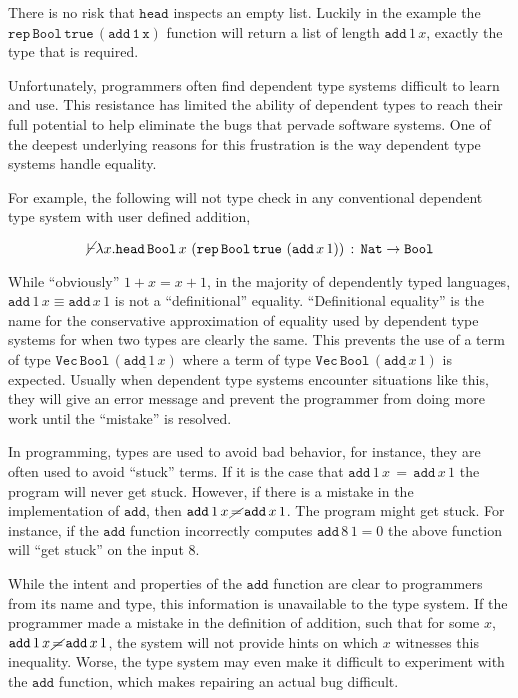 There is no risk that $\mathtt{head}$ inspects an empty list.
Luckily in the example the $\mathtt{\mathtt{rep}\,\mathtt{Bool}\,\mathtt{true}\,\left(\mathtt{add}\,1\,x\right)}$ function will return a list of length $\mathtt{add}\,1\,x$, exactly the type that is required.


Unfortunately, programmers often find dependent type systems difficult to learn and use.
This resistance has limited the ability of dependent types to reach their full potential to help eliminate the bugs that pervade software systems.
One of the deepest underlying reasons for this frustration is the way dependent type systems handle equality.

For example, the following will not type check in any conventional dependent type system with user defined addition,

\[
\cancel{\vdash}\lambda x.\mathtt{head}\,\mathtt{Bool}\,x\,\left(\mathtt{rep}\,\mathtt{Bool}\,\mathtt{true}\,\left(\mathtt{add}\,x\,1\right)\right)\,:\,\mathtt{Nat}\rightarrow\mathtt{Bool}
\]

While ``obviously'' $1+x=x+1$, in the majority of dependently typed languages, $\mathtt{add}\,1\,x\equiv\mathtt{add}\,x\,1$ is not a ``definitional'' equality.
``Definitional equality'' is the name for the conservative approximation of equality used by dependent type systems for when two types are clearly the same.
This prevents the use of a term of type
$\mathtt{Vec}\,\mathtt{Bool}\,\left(\underline{\mathtt{add}\,1\,x}\right)$
where a term of type
$\mathtt{Vec}\,\mathtt{Bool}\,\left(\underline{\mathtt{add}\,x\,1}\right)$
is expected.
Usually when dependent type systems encounter situations like this, they will give an error message and prevent the programmer from doing more work until the ``mistake'' is resolved.

In programming, types are used to avoid bad behavior, for instance, they are often used to avoid ``stuck'' terms.
If it is the case that $\mathtt{add}\,1\,x\,=\,\mathtt{add}\,x\,1$ the program will never get stuck.
However, if there is a mistake in the implementation of $\mathtt{add}$, then $\mathtt{add}\,1\,x\,\cancel{=}\,\mathtt{add}\,x\,1$.
The program might get stuck.
For instance, if the $\mathtt{add}$ function incorrectly computes $\mathtt{add}\,8\,1=0$ the above function will ``get stuck'' on the input $8$.

While the intent and properties of the $\mathtt{add}$ function are clear to programmers from its name and type, this information is unavailable to the type system.
If the programmer made a mistake in the definition of addition, such that for some $x$, $\mathtt{add}\,1\,x\,\cancel{=}\,\mathtt{add}\,x\,1$, the system will not provide hints on which $x$ witnesses this inequality.
Worse, the type system may even make it difficult to experiment with the $\mathtt{add}$ function, which makes repairing an actual bug difficult.


